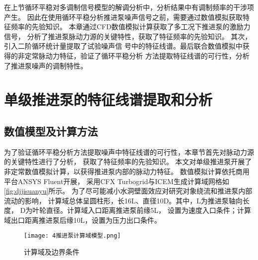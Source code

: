 在上节循环平稳对多调制信号模型的解调分析中，分析结果中有调制频率的干涉项产生。
因此在使用循环平稳分析推进泵噪声信号之前，需要通过数值模拟获取特征频率的先验知识。
本章通过CFD数值模拟计算获取了多工况下推进泵的激励力信号，
分析了推进泵脉动力源的关键特性，获取了特征频率的先验知识。
其次，引入二阶循环统计量提取了试验噪声信
号中的特征线谱。最后联合数值模拟中获得的非定常脉动力特征，验证了循环平稳分析
方法提取特征线谱的可行性，分析了推进泵噪声的调制特性。

\begin{comment}
    
推进泵噪声是推进泵流致激励特性的最直接的外在表现，
推进泵噪声信号中包含着丰富的运行状态和流致激励源特性，
前面章节的研究表明推进泵噪声的频谱呈现出宽带与线谱交叠的形貌，中低频线谱成分复杂，
噪声信噪比较低，特征信号如流致激励源特征频率、轴频等与其他背景噪声相比均较为微弱，
给基于传统噪声特征提取方法带来了困难，难以准确的获得推进泵的工作状态和结构信息。
上章节通过对噪声的成分分析，基于推进泵噪声的循环平稳特征，推导出流致激励源-噪声信号的幅值调制模型。
进一步为了验证从噪声信号中提取流致激励源特征的合理性和可行性，
本章节通过非定常数值模拟计算获取了多工况下推进泵的激励力信号，
分析了推进泵流致振动噪声源的关键特性，
采用循环平稳分析方法实现推进泵低频特征的提取，
联合从噪声信号中提取特征频率的结果与流致激励源的模拟结果，
从噪声信号中分析出流致激励源对噪声的影响程度以及两者的作用机理，
探究推进泵噪声的调制特性。
\end{comment}
\section{单级推进泵的特征线谱提取和分析}
\subsection{数值模型及计算方法}
为了验证循环平稳分析方法提取噪声中特征线谱的可行性，本章节首先对脉动力源的关键特性进行了分析，
获取了特征频率的先验知识。
本文对单级推进泵开展了非定常数值模拟计算，以获得推进泵内部的脉动力特征。
数值模拟计算依托商用平台ANSYS Fluent开展，
采用CFX Turbogrid与ICEM生成计算域网格如\autoref{fig:djjisuanyu}所示。
为了尽可能减小水洞壁面效应对研究对象绕流和推进泵内部流动的影响，
计算域总体呈圆柱形，长16L、直径10D\cite{jiang2017}。其中，L为推进泵轴向长度，
D为叶轮直径。计算域入口距离推进泵前缘5L，
设置为速度入口条件；计算域出口距离推进泵后缘10L，设置为压力出口条件。
\begin{figure}[htbp]
    \centering
    \texttt{[image: 4推进泵计算域模型.png]}
    \caption{\label{fig:djjisuanyu}计算域及边界条件}
\end{figure}

